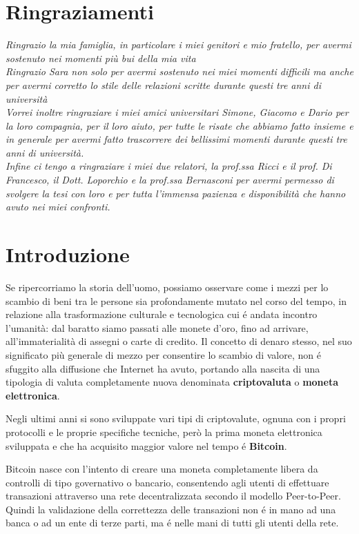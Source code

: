 \chapter*{Ringraziamenti} %
\begin{flushright}
\itshape 
Ringrazio la mia famiglia, in particolare i miei genitori e mio fratello, per avermi sostenuto nei momenti più bui della mia vita\\
Ringrazio Sara non solo per avermi sostenuto nei miei momenti difficili ma anche per avermi corretto lo stile delle relazioni scritte durante questi tre anni di università\\ 
Vorrei inoltre ringraziare i miei amici universitari Simone, Giacomo e Dario per la loro compagnia, per il loro aiuto, per tutte le risate che abbiamo fatto insieme e in generale per avermi fatto trascorrere dei bellissimi momenti durante questi tre anni di università.\\
Infine ci tengo a ringraziare i miei due relatori, la prof.ssa Ricci e il prof. Di Francesco, il Dott. Loporchio e la prof.ssa Bernasconi per avermi permesso di svolgere la tesi con loro e per tutta l'immensa pazienza e disponibilità che hanno avuto nei miei confronti.
\end{flushright}


\chapter{Introduzione}
Se ripercorriamo la storia dell'uomo, possiamo osservare come i mezzi per lo scambio di beni tra le persone sia profondamente mutato nel corso del tempo, in relazione alla trasformazione culturale e tecnologica cui é andata incontro l’umanità: dal baratto siamo passati alle monete d’oro, fino ad arrivare, all’immaterialità di assegni o carte di credito. Il concetto di denaro stesso, nel suo significato più generale di mezzo per consentire lo scambio di valore, non é sfuggito alla diffusione che Internet ha avuto, portando alla nascita di una tipologia di valuta completamente nuova denominata \textbf{criptovaluta} o \textbf{moneta elettronica}. 

Negli ultimi anni si sono sviluppate vari tipi di criptovalute, ognuna con i propri protocolli e le proprie specifiche tecniche, però la prima moneta elettronica sviluppata e che ha acquisito maggior valore nel tempo é \textbf{Bitcoin}. 

Bitcoin nasce con l'intento di creare una moneta completamente libera da controlli di tipo governativo o bancario, consentendo agli utenti di effettuare transazioni attraverso una rete decentralizzata secondo il modello Peer-to-Peer. Quindi la validazione della correttezza delle transazioni non é in mano ad una banca o ad un ente di terze parti, ma é nelle mani di tutti gli utenti della rete. 

